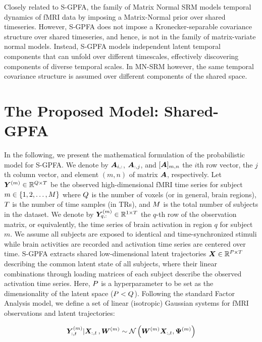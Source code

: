 Closely related to S-GPFA, the family of Matrix Normal SRM \cite{mnsrm} models temporal dynamics of fMRI data by imposing a Matrix-Normal prior over shared timeseries. However, S-GPFA does not impose a Kronecker-separable covariance structure over shared timeseries, and hence, is not in the family of matrix-variate normal models. Instead, S-GPFA models independent latent temporal components that can unfold over different timescales, effectively discovering components of diverse temporal scales. In MN-SRM however, the same temporal covariance structure is assumed over different components of the shared space.

\section{The Proposed Model: Shared-GPFA}
\label{sec:sgpfa}

In the following, we present the mathematical formulation of the probabilistic model for S-GPFA. We denote by $\bm{A}_{i,:}$, $\bm{A}_{:, j}$, and $[\bm{A}]_{m,n}$ the $i$th row vector, the $j$th column vector, and element $(m, n)$ of matrix $\bm{A}$, respectively. Let $\bm{Y}^{(m)} \in \mathbb{R}^{Q \times T}$ be the observed high-dimensional fMRI time series for subject $m \in \{1, 2, \ldots, M \}$ where $Q$ is the number of voxels (or in general, brain regions), $T$ is the number of time samples (in TRs), and $M$ is the total number of subjects in the dataset. We denote by $\bm{Y}^{(m)}_{q,:} \in \mathbb{R}^{1\times T}$ the $q$-th row of the observation matrix, or equivalently, the time series of brain activation in region $q$ for subject $m$. We assume all subjects are exposed to identical and time-synchronized stimuli while brain activities are recorded and activation time series are centered over time.
S-GPFA extracts shared low-dimensional latent trajectories $\bm{X} \in \mathbb{R}^{P \times T}$ describing the common latent state of all subjects, where their linear combinations through loading matrices of each subject describe the observed activation time series.
Here, $P$ is a hyperparameter to be set as the dimensionality of the latent space ($P < Q$). 
Following the standard Factor Analysis model, we define a set of linear (isotropic) Gaussian systems for fMRI observations and latent trajectories:

\begin{equation}
    \bm{Y}^{(m)}_{:, t} | \bm{X}_{:, t}\, , \bm{W}^{(m)} \sim \mathcal{N} \left( \bm{W}^{(m)} \bm{X}_{:, t}, \bm{\Psi}^{(m)} \right)
\end{equation}

